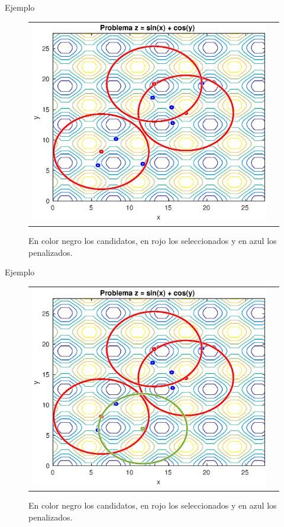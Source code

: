 \documentclass{beamer}
\begin{document}
\begin{frame}{Ejemplo}
\begin{figure}[H]
  \centering
  \begin{tabular}{c c}
   \includegraphics[scale=0.6]{4.eps} 
  \end{tabular}
  \caption{\scriptsize En color negro los candidatos, en rojo los seleccionados y en azul los penalizados.}
\end{figure}
\end{frame}

\begin{frame}{Ejemplo}
\begin{figure}[H]
  \centering
  \begin{tabular}{c c}
   \includegraphics[scale=0.6]{5.eps} 
  \end{tabular}
  \caption{\scriptsize En color negro los candidatos, en rojo los seleccionados y en azul los penalizados.}
\end{figure}
\end{frame}
\end{document}
